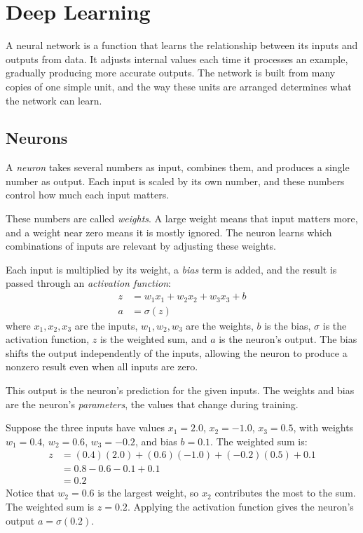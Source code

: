 \section{Deep Learning}
\label{sec:deep-learning}

A neural network is a function that learns the relationship between its
inputs and outputs from data. It adjusts internal values each time it
processes an example, gradually producing more accurate outputs. The
network is built from many copies of one simple unit, and the way these
units are arranged determines what the network can learn.

\subsection{Neurons}
\label{subsec:neurons}

A \emph{neuron} takes several numbers as input, combines them, and
produces a single number as output. Each input is scaled by its own
number, and these numbers control how much each input matters.

\smallskip
These numbers are called \emph{weights}. A large weight means that
input matters more, and a weight near zero means it is mostly ignored.
The neuron learns which combinations of inputs are relevant by
adjusting these weights.

\smallskip
Each input is multiplied by its weight, a \emph{bias} term is added,
and the result is passed through an \emph{activation function}:
%
\begin{align}
\label{eq:neuron-z}
z &= w_1 x_1 + w_2 x_2 + w_3 x_3 + b \\
\label{eq:neuron-a}
a &= \sigma(z)
\end{align}
%
where $x_1, x_2, x_3$ are the inputs, $w_1, w_2, w_3$ are the
weights, $b$ is the bias, $\sigma$ is the activation function, $z$ is the
weighted sum, and $a$ is the neuron's output. The bias shifts the output
independently of the inputs, allowing the neuron to produce a nonzero
result even when all inputs are zero.

\smallskip
This output is the neuron's prediction for the given inputs. The weights
and bias are the neuron's \emph{parameters}, the values that change
during training.



\begin{example}
\label{ex:neuron}
Suppose the three inputs have values $x_1 = 2.0$, $x_2 = -1.0$,
$x_3 = 0.5$, with weights $w_1 = 0.4$, $w_2 = 0.6$, $w_3 = -0.2$, and
bias $b = 0.1$. The weighted sum is:
%
\begin{align*}
z &= (0.4)(2.0) + (0.6)(-1.0) + (-0.2)(0.5) + 0.1 \\
  &= 0.8 - 0.6 - 0.1 + 0.1 \\
  &= 0.2
\end{align*}
%
Notice that $w_2 = 0.6$ is the largest weight, so $x_2$ contributes the
most to the sum. The weighted sum is $z = 0.2$. Applying the activation
function gives the neuron's output $a = \sigma(0.2)$.
\end{example}

